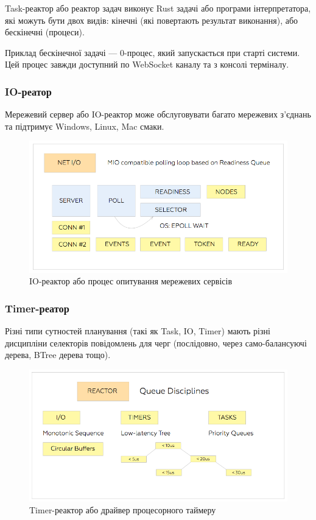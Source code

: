 \begin{definition}
\begin{definition}
\begin{definition}
\begin{definition}
Task-реактор або реактор задач виконує Rust задачі або
програми інтерпретатора, які можуть бути двох видів:
кінечні (які повертають результат виконання),
або бескінечні (процеси).

Приклад бескінечної задачі --- 0-процес,
який запускається при старті системи. Цей процес завжди доступний
по WebSocket каналу та з консолі терміналу.

\subsubsection*{IO-реатор}

Мережевий сервер або IO-реактор може обслуговувати багато
мережевих з'єднань та підтримує Windows, Linux, Mac смаки.

\begin{figure}[h]
  \centerline{\includegraphics[scale=0.28]{net}}
  \caption{IO-реактор або процес опитування мережевих сервісів}
\end{figure}

\subsubsection*{Timer-реатор}

Різні типи сутностей планування (такі як Task, IO, Timer)
мають різні дисципліни селекторів повідомлень для черг
(послідовно, через само-балансуючі дерева, BTree дерева тощо).

\begin{figure}[h]
  \centerline{\includegraphics[scale=0.28]{dis}}
  \caption{Timer-реактор або драйвер процесорного таймеру}
\end{figure}


\end{definition}
\end{definition}
\end{definition}
\end{definition}
